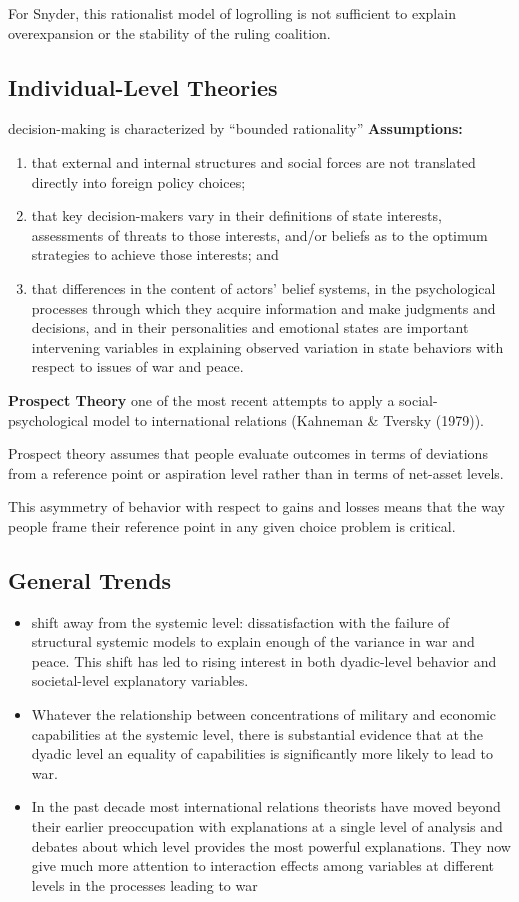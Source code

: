 For Snyder, this rationalist model of logrolling is not sufficient to explain overexpansion or the stability of the ruling coalition.

\subsection{Individual-Level Theories}
decision-making is characterized by “bounded rationality”
\textbf{Assumptions:}
\begin{enumerate}
    \item [(a)] that external and internal structures and social forces are not translated directly into foreign policy choices;
    \item [(b)] that key decision-makers vary in their definitions of state interests, assessments of threats to those interests, and/or beliefs as to the optimum strategies to achieve those interests; and
    \item [(c)] that differences in the content of actors’ belief systems, in the psychological processes through which they acquire information and make judgments and decisions, and in their personalities and emotional states are important intervening variables in explaining observed variation in state behaviors with respect to issues of war and peace.
\end{enumerate}

\textbf{Prospect Theory} one of the most recent attempts to apply a social-psychological model to international relations (Kahneman \& Tversky (1979)).

Prospect theory assumes that people evaluate outcomes in terms of deviations from a reference point or aspiration level rather than in terms of net-asset levels.

This asymmetry of behavior with respect to gains and losses means that the way people frame their reference point in any given choice problem is critical.

\subsection{General Trends}

\begin{itemize}
    \item shift away from the systemic level: dissatisfaction with the failure of structural systemic models to explain enough of the variance in war and peace. This shift has led to rising interest in both dyadic-level behavior and societal-level explanatory variables.
    \item Whatever the relationship between concentrations of military and economic capabilities at the systemic level, there is substantial evidence that at the dyadic level an equality of capabilities is significantly more likely to lead to war.
    \item In the past decade most international relations theorists have moved beyond their earlier preoccupation with explanations at a single level of analysis and debates about which level provides the most powerful explanations. They now give much more attention to interaction effects among variables at different levels in the processes leading to war
\end{itemize}
